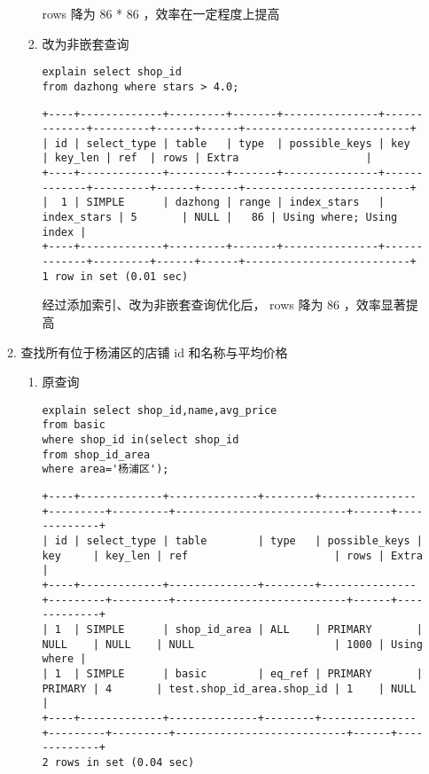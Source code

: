 \documentclass[11pt]{article}
\begin{document}
\begin{itemize}
\begin{enumerate}
\begin{enumerate}
rows 降为 86 * 86 ，效率在一定程度上提高

\item 改为非嵌套查询

\begin{lstlisting}
explain select shop_id
from dazhong where stars > 4.0;
\end{lstlisting}

\begin{verbatim}
+----+-------------+---------+-------+---------------+-------------+---------+------+------+--------------------------+
| id | select_type | table   | type  | possible_keys | key         | key_len | ref  | rows | Extra                    |
+----+-------------+---------+-------+---------------+-------------+---------+------+------+--------------------------+
|  1 | SIMPLE      | dazhong | range | index_stars   | index_stars | 5       | NULL |   86 | Using where; Using index |
+----+-------------+---------+-------+---------------+-------------+---------+------+------+--------------------------+
1 row in set (0.01 sec)
\end{verbatim}

经过添加索引、改为非嵌套查询优化后， rows 降为 86 ，效率显著提高
\end{enumerate}

\item 查找所有位于杨浦区的店铺 id 和名称与平均价格

\begin{enumerate}
\item 原查询

\begin{lstlisting}
explain select shop_id,name,avg_price
from basic
where shop_id in(select shop_id
from shop_id_area
where area='杨浦区');
\end{lstlisting}

\begin{verbatim}
+----+-------------+--------------+--------+---------------+---------+---------+---------------------------+------+-------------+
| id | select_type | table        | type   | possible_keys | key     | key_len | ref                       | rows | Extra       |
+----+-------------+--------------+--------+---------------+---------+---------+---------------------------+------+-------------+
| 1  | SIMPLE      | shop_id_area | ALL    | PRIMARY       | NULL    | NULL    | NULL                      | 1000 | Using where |
| 1  | SIMPLE      | basic        | eq_ref | PRIMARY       | PRIMARY | 4       | test.shop_id_area.shop_id | 1    | NULL        |
+----+-------------+--------------+--------+---------------+---------+---------+---------------------------+------+-------------+
2 rows in set (0.04 sec)
\end{verbatim}


\end{enumerate}
\end{enumerate}
\end{itemize}
\end{document}

